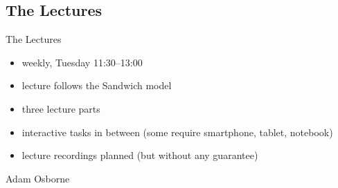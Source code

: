 \subsection{The Lectures}
\begin{frame}{\insertsubsection}
	\begin{fancycolumns}[widths={60}]
		\begin{definition}{The Lectures}
			\begin{itemize}
				\item weekly, Tuesday 11:30--13:00
				\item lecture follows the Sandwich model
				\item three lecture parts
				\item interactive tasks in between (some require smartphone, tablet, notebook)
				\item lecture recordings planned (but without any guarantee)
			\end{itemize}
		\end{definition}
	\nextcolumn
		\begin{note}{Adam Osborne} %
		\end{note}
	\end{fancycolumns}
\end{frame}

